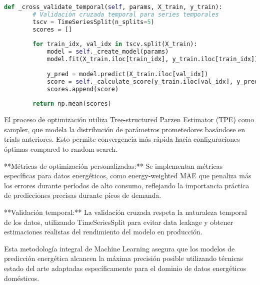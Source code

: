 \begin{lstlisting}[language=Python, caption=Optimización bayesiana de hiperparámetros]
    def _cross_validate_temporal(self, params, X_train, y_train):
        # Validación cruzada temporal para series temporales
        tscv = TimeSeriesSplit(n_splits=5)
        scores = []
        
        for train_idx, val_idx in tscv.split(X_train):
            model = self._create_model(params)
            model.fit(X_train.iloc[train_idx], y_train.iloc[train_idx])
            
            y_pred = model.predict(X_train.iloc[val_idx])
            score = self._calculate_score(y_train.iloc[val_idx], y_pred)
            scores.append(score)
        
        return np.mean(scores)
\end{lstlisting}

El proceso de optimización utiliza Tree-structured Parzen Estimator (TPE) como sampler, que modela la distribución de parámetros prometedores basándose en trials anteriores. Esto permite convergencia más rápida hacia configuraciones óptimas compared to random search.

**Métricas de optimización personalizadas:** Se implementan métricas específicas para datos energéticos, como energy-weighted MAE que penaliza más los errores durante períodos de alto consumo, reflejando la importancia práctica de predicciones precisas durante picos de demanda.

**Validación temporal:** La validación cruzada respeta la naturaleza temporal de los datos, utilizando TimeSeriesSplit para evitar data leakage y obtener estimaciones realistas del rendimiento del modelo en producción.

Esta metodología integral de Machine Learning asegura que los modelos de predicción energética alcancen la máxima precisión posible utilizando técnicas estado del arte adaptadas específicamente para el dominio de datos energéticos domésticos.
